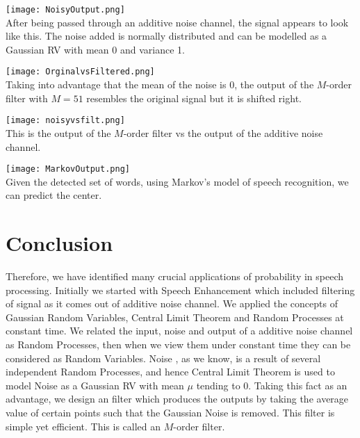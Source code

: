 \documentclass[10pt,twocolumn,letterpaper]{article}
\begin{document}
\begin{center}
    \texttt{[image: NoisyOutput.png]}\\
    After being passed through an additive noise channel, the signal appears to look like this. The noise added is normally distributed and can be modelled as a Gaussian RV with mean 0 and variance 1. 
\end{center} \vskip 0.2cm

\begin{center}
    \texttt{[image: OrginalvsFiltered.png]}\\
    Taking into advantage that the mean of the noise is 0, the output of the $M$-order filter with $M=51$ resembles the original signal but it is shifted right. 
\end{center} \vskip 0.2cm

\begin{center}
    \texttt{[image: noisyvsfilt.png]}\\
    This is the output of the $M$-order filter vs the output of the additive noise channel.
\end{center}

\begin{center}
    \texttt{[image: MarkovOutput.png]}\\
    Given the detected set of words, using Markov's model of speech recognition, we can predict the center.
\end{center}









\section{Conclusion}

\par Therefore, we have identified many crucial applications of probability in speech processing. Initially we started with Speech Enhancement which included filtering of signal as it comes out of additive noise channel. We applied the concepts of Gaussian Random Variables, Central Limit Theorem and Random Processes at constant time. We related the input, noise and output of a additive noise channel as Random Processes, then when we view them under constant time they can be considered as Random Variables. Noise , as we know, is a result of several independent Random Processes, and hence Central Limit Theorem is used to model Noise as a Gaussian RV with mean $\mu$ tending to 0. Taking this fact as an advantage, we design an filter which produces the outputs by taking the average value of certain points such that the Gaussian Noise is removed. This filter is simple yet efficient. This is called an $M$-order filter. \\
\end{document}
